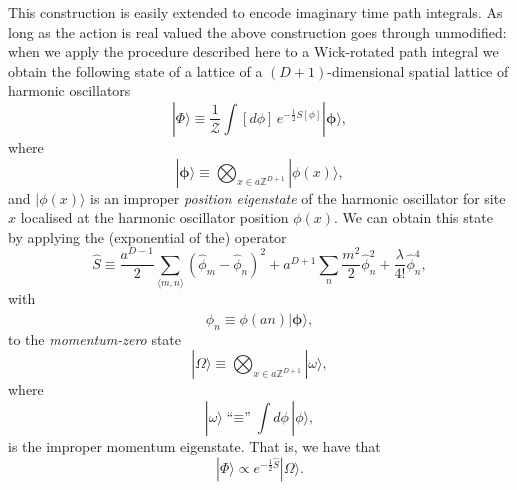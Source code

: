 \documentclass[twocolumn,lengthcheck,superscriptaddress]{revtex4-1}
\theoremstyle{definition}
\theoremstyle{remark}
\begin{document}
This construction is easily extended to encode imaginary time path integrals. As long as the action is real valued the above construction goes through unmodified: when we apply the procedure described here to a Wick-rotated path integral we obtain the following state of a lattice of a $(D+1)$-dimensional spatial lattice of harmonic oscillators 
\begin{equation}\label{eq:qls}
	|\Phi\rangle \equiv \frac{1}{\mathcal{Z}}\int [d\phi] \,e^{-\frac{1}{2}S[\phi]}  |\boldsymbol{\phi}\rangle,
\end{equation}
where
\begin{equation}
	|\boldsymbol{\phi}\rangle \equiv \bigotimes_{x\in a\mathbb{Z}^{D+1}} |\phi(x)\rangle,
\end{equation}
and $|\phi(x)\rangle$ is an improper \emph{position eigenstate} of the harmonic oscillator for site $x$ localised at the harmonic oscillator position $\phi(x)$. We can obtain this state by applying the (exponential of the) operator 
\begin{equation}
	\widehat{S} \equiv \frac{a^{D-1}}{2}\sum_{\langle m,n\rangle} (\widehat{\phi}_m-\widehat{\phi}_n)^2 + a^{D+1}\sum_{n} \frac{m^2}{2}\widehat{\phi}_n^2 + \frac{\lambda}{4!} \widehat{\phi}_n^4,
\end{equation}
with 
\begin{equation}
	\widehat{\phi}_n  \equiv \phi(an)|\boldsymbol{\phi}\rangle,
\end{equation}
to the \emph{momentum-zero} state
\begin{equation}
	|\Omega\rangle \equiv \bigotimes_{x\in a\mathbb{Z}^{D+1}} |\omega\rangle,
\end{equation}
where
\begin{equation}
	|\omega\rangle \text{``$\equiv$''} \int d\phi\, |\phi\rangle,
\end{equation}
is the improper momentum eigenstate. That is, we have that
\begin{equation}
	|\Phi\rangle \propto e^{-\frac12 \widehat{S}}|\Omega\rangle. 
\end{equation}
\end{document}
